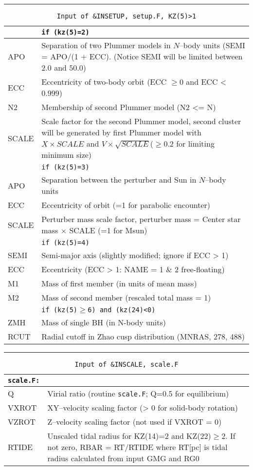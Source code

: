 \hrule
\noindent
\begin{longtable}{@{}p{1.5cm}p{13.0cm}}
\caption{\texttt{Input of \&INSETUP, setup.F, KZ(5)>1}}
\label{table:insetup}\\\hline
       & \texttt{if (kz(5)=2)} \\\hline
APO    & Separation of two Plummer models in $N$--body units (SEMI = APO/(1 $+$ ECC). (Notice SEMI will be limited between $2.0$ and $50.0$) \\
ECC    & Eccentricity of two-body orbit (ECC $\ge$0 and ECC < $0.999$) \\
N2     & Membership of second Plummer model (N2 <= N) \\
SCALE  & Scale factor for the second Plummer model, second cluster will be generated by first Plummer model with $X \times SCALE$ and $V \times \sqrt{SCALE}$($\ge 0.2$ for limiting minimum size) \\\hline
       & \texttt{if (kz(5)=3)} \\\hline
APO    & Separation between the perturber and Sun in $N$--body units \\
ECC    & Eccentricity of orbit (=1 for parabolic encounter) \\
SCALE  & Perturber mass scale factor, perturber mass = Center star mass $\times$ SCALE (=1 for Msun) \\\hline
       & \texttt{if (kz(5)=4)} \\\hline
SEMI   & Semi-major axis (slightly modified; ignore if ECC > 1) \\
ECC    & Eccentricity (ECC > 1: NAME = 1 \& 2 free-floating) \\
M1     & Mass of first member (in units of mean mass) \\
M2     & Mass of second member (rescaled total mass = 1) \\\hline
       & \texttt{if (kz(5)$\ge$6) and (kz(24)<0)} \\\hline
ZMH    & Mass of single BH (in N-body units) \\
RCUT   & Radial cutoff in Zhao cusp distribution (MNRAS, 278, 488) \\
\end{longtable}

\hrule
\noindent
\begin{longtable}{@{}p{1.5cm}p{13.0cm}}
\caption{\texttt{Input of \&INSCALE, scale.F}}
\label{table:inscale}\\\hline
\texttt{scale.F:} & \\\hline
%
Q       & Virial ratio (routine \texttt{scale.F}; Q=0.5 for equilibrium) \\
VXROT   & XY--velocity scaling factor (> 0 for solid-body rotation) \\
VZROT   & Z--velocity scaling factor (not used if VXROT = 0) \\
RTIDE   & Unscaled tidal radius for KZ(14)=2 and KZ(22)$\ge$2. If not zero, RBAR = RT/RTIDE where RT[pc] is tidal radius calculated from input GMG and RG0\\
\end{longtable}


